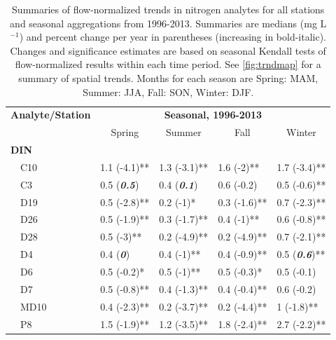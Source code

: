 \documentclass[journal = esthag, manuscript = article]{achemso}\usepackage[]{graphicx}\usepackage[]{color}
\begin{document}
\begin{suppinfo}
\begin{table}[!tbp]
\caption{Summaries of flow-normalized trends in nitrogen analytes for all stations and seasonal aggregations from 1996-2013. Summaries are  medians (mg L$^{-1}$) and percent change per year in parentheses (increasing in bold-italic). Changes and significance estimates are based on seasonal Kendall tests of flow-normalized results within each time period. See \cref{fig:trndmap} for a summary of spatial trends. Months for each season are Spring: MAM, Summer: JJA, Fall: SON, Winter: DJF.\label{tab:trndsaft}} 
\begin{center}
\begin{tabular}{lllll}
\hline\hline
\multicolumn{1}{l}{\bfseries Analyte/Station}&\multicolumn{4}{c}{\bfseries Seasonal, 1996-2013}\tabularnewline
\cline{2-5}
\multicolumn{1}{l}{}&\multicolumn{1}{c}{Spring}&\multicolumn{1}{c}{Summer}&\multicolumn{1}{c}{Fall}&\multicolumn{1}{c}{Winter}\tabularnewline
\hline
{\bfseries DIN}&&&&\tabularnewline
~~C10&1.1 \footnotesize{(-4.1)**}&1.3 \footnotesize{(-3.1)**}&1.6 \footnotesize{(-2)**}&1.7 \footnotesize{(-3.4)**}\tabularnewline
~~C3&0.5 \footnotesize{(\textit{\textbf{0.5}})}&0.4 \footnotesize{(\textit{\textbf{0.1}})}&0.6 \footnotesize{(-0.2)}&0.5 \footnotesize{(-0.6)**}\tabularnewline
~~D19&0.5 \footnotesize{(-2.8)**}&0.2 \footnotesize{(-1)*}&0.3 \footnotesize{(-1.6)**}&0.7 \footnotesize{(-2.3)**}\tabularnewline
~~D26&0.5 \footnotesize{(-1.9)**}&0.3 \footnotesize{(-1.7)**}&0.4 \footnotesize{(-1)**}&0.6 \footnotesize{(-0.8)**}\tabularnewline
~~D28&0.5 \footnotesize{(-3)**}&0.2 \footnotesize{(-4.9)**}&0.2 \footnotesize{(-4.9)**}&0.7 \footnotesize{(-2.1)**}\tabularnewline
~~D4&0.4 \footnotesize{(\textit{\textbf{0}})}&0.4 \footnotesize{(-1)**}&0.4 \footnotesize{(-0.9)**}&0.5 \footnotesize{(\textit{\textbf{0.6}})**}\tabularnewline
~~D6&0.5 \footnotesize{(-0.2)*}&0.5 \footnotesize{(-1)**}&0.5 \footnotesize{(-0.3)*}&0.5 \footnotesize{(-0.1)}\tabularnewline
~~D7&0.5 \footnotesize{(-0.8)**}&0.4 \footnotesize{(-1.3)**}&0.4 \footnotesize{(-0.4)**}&0.6 \footnotesize{(-0.2)}\tabularnewline
~~MD10&0.4 \footnotesize{(-2.3)**}&0.2 \footnotesize{(-3.7)**}&0.2 \footnotesize{(-4.4)**}&1 \footnotesize{(-1.8)**}\tabularnewline
~~P8&1.5 \footnotesize{(-1.9)**}&1.2 \footnotesize{(-3.5)**}&1.8 \footnotesize{(-2.4)**}&2.7 \footnotesize{(-2.2)**}\tabularnewline

\end{tabular}
\end{center}
\end{table}
\end{suppinfo}
\end{document}
